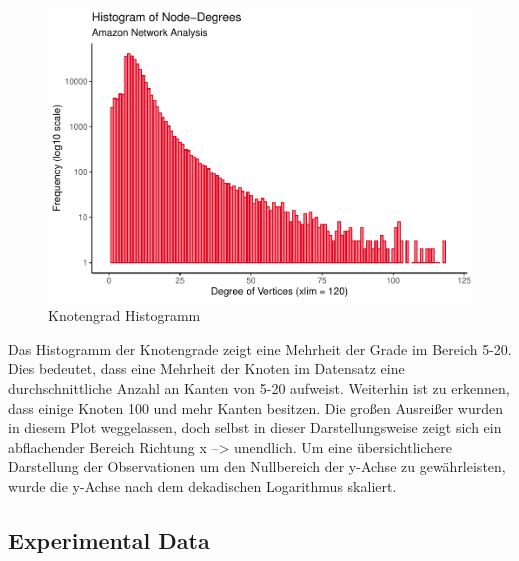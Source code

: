 \documentclass[
  12 pt,
]{article}
\newenvironment{Shaded}{\begin{snugshade}}{\end{snugshade}}
\newcommand{\CommentTok}[1]{\textcolor[rgb]{0.56,0.35,0.01}{\textit{#1}}}
\newcommand{\DataTypeTok}[1]{\textcolor[rgb]{0.13,0.29,0.53}{#1}}
\newcommand{\DecValTok}[1]{\textcolor[rgb]{0.00,0.00,0.81}{#1}}
\newcommand{\KeywordTok}[1]{\textcolor[rgb]{0.13,0.29,0.53}{\textbf{#1}}}
\newcommand{\NormalTok}[1]{#1}
\newcommand{\OperatorTok}[1]{\textcolor[rgb]{0.81,0.36,0.00}{\textbf{#1}}}
\newcommand{\StringTok}[1]{\textcolor[rgb]{0.31,0.60,0.02}{#1}}
\begin{document}
\begin{figure}
\centering
\includegraphics{Assignment_files/figure-latex/viz-1.pdf}
\caption{Knotengrad Histogramm}
\end{figure}

Das Histogramm der Knotengrade zeigt eine Mehrheit der Grade im Bereich
5-20. Dies bedeutet, dass eine Mehrheit der Knoten im Datensatz eine
durchschnittliche Anzahl an Kanten von 5-20 aufweist. Weiterhin ist zu
erkennen, dass einige Knoten 100 und mehr Kanten besitzen. Die großen
Ausreißer wurden in diesem Plot weggelassen, doch selbst in dieser
Darstellungsweise zeigt sich ein abflachender Bereich Richtung x
--\textgreater{} unendlich. Um eine übersichtlichere Darstellung der
Observationen um den Nullbereich der y-Achse zu gewährleisten, wurde die
y-Achse nach dem dekadischen Logarithmus skaliert.

\hypertarget{experimental-data}{%
\subsection{Experimental Data}\label{experimental-data}}

\begin{Shaded}
\end{Shaded}
\end{document}
